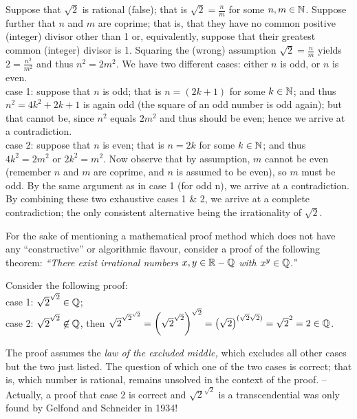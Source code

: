 {\color{OliveGreen}
\bproof
Suppose that $\sqrt{2}$ is rational (false); that is
$\sqrt{2} = \frac{n}{m}$ for some $n, m \in {\Bbb N}$.
Suppose further that $n$ and $m$ are coprime;
that is, that they have no common positive (integer) divisor other than 1 or, equivalently,
suppose that their greatest common (integer) divisor is 1.
Squaring the  (wrong) assumption $\sqrt{2} = \frac{n}{m}$ yields $2= \frac{n^2}{m^2}$ and thus $n^2 =2m^2$.
We have two different cases: either $n$ is odd, or $n$ is even.
 \\
case 1: suppose that $n$ is odd; that is $n=(2k+1)$ for some $k\in {\Bbb N}$; and thus
$n^2 = 4k^2+2k+1$ is again odd (the square of an odd number is odd again); but that cannot be,
since $n^2$ equals $2m^2$ and thus should be even; hence we arrive at a contradiction.
\\
case 2:  suppose that $n$ is even;  that is $n=2k$ for some $k\in {\Bbb N}$; and thus
$4k^2 = 2m^2$ or $2k^2 = m^2$.
Now observe that by assumption, $m$ cannot be even (remember  $n$ and $m$ are coprime, and
$n$ is assumed to be even), so $m$ must be odd. By the same argument as in case 1 (for odd n),
we arrive at a contradiction.
By combining these two exhaustive cases 1 \& 2, we arrive at a complete contradiction;
the only consistent alternative being the irrationality of $\sqrt{2}$.
\eproof
}





 For the sake of mentioning a mathematical proof method which
 does not have any ``constructive'' or algorithmic flavour, consider a proof of the
 following theorem: {\em ``There exist
 irrational numbers $x,y\in {\Bbb R} - {\Bbb Q}$ with $x^y\in {\Bbb Q}$.''}

{\color{OliveGreen}
\bproof
{Consider the following proof:}\\
case 1: $ \sqrt{2} ^{ \sqrt{2} } \in {\Bbb Q} $;
  \\
case 2: $ \sqrt{2} ^{ \sqrt{2} } \not\in {\Bbb Q}$, then
$ \sqrt{2} ^{{ \sqrt{2} } ^{ \sqrt{2} }}
={\left({\sqrt{2} }^{ \sqrt{2} } \right)}^{ \sqrt{2} }
=\left(\sqrt{2}\right) ^{(  \sqrt{2}   \sqrt{2}  )} =
\sqrt{2} ^2 =2\in {\Bbb Q}$.
\eproof
}

The proof assumes the {\em law of the excluded middle,}
which excludes all other cases but the two just listed.
The question of which one of the two cases is correct; that is,
which number is rational, remains unsolved in the context of the proof.
--
Actually, a proof that case 2 is correct and  $\sqrt{2} ^{
 \sqrt{2} }$ is a transcendential was only found by  Gelfond and Schneider
in 1934!



